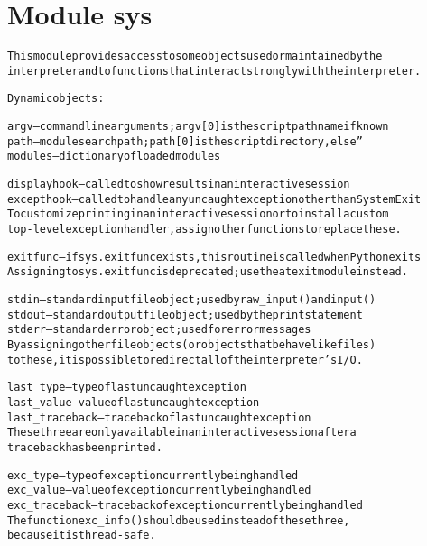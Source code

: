 %
%
%


\section{Module sys}

    \label{sys}
\begin{alltt}
This module provides access to some objects used or maintained by the
interpreter and to functions that interact strongly with the interpreter.

Dynamic objects:

argv -- command line arguments; argv[0] is the script pathname if known
path -- module search path; path[0] is the script directory, else ''
modules -- dictionary of loaded modules

displayhook -- called to show results in an interactive session
excepthook -- called to handle any uncaught exception other than SystemExit
  To customize printing in an interactive session or to install a custom
  top-level exception handler, assign other functions to replace these.

exitfunc -- if sys.exitfunc exists, this routine is called when Python exits
  Assigning to sys.exitfunc is deprecated; use the atexit module instead.

stdin -- standard input file object; used by raw\_input() and input()
stdout -- standard output file object; used by the print statement
stderr -- standard error object; used for error messages
  By assigning other file objects (or objects that behave like files)
  to these, it is possible to redirect all of the interpreter's I/O.

last\_type -- type of last uncaught exception
last\_value -- value of last uncaught exception
last\_traceback -- traceback of last uncaught exception
  These three are only available in an interactive session after a
  traceback has been printed.

exc\_type -- type of exception currently being handled
exc\_value -- value of exception currently being handled
exc\_traceback -- traceback of exception currently being handled
  The function exc\_info() should be used instead of these three,
  because it is thread-safe.


\end{alltt}

